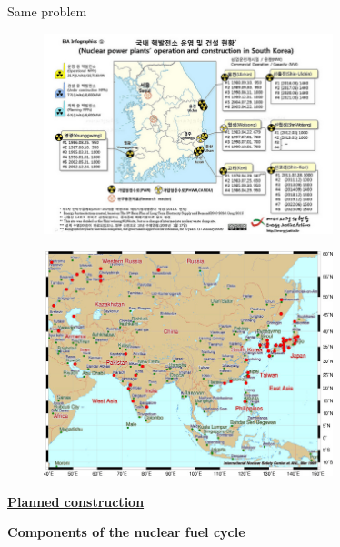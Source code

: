 \documentclass[aspectratio=1610,pdftex,dvipsnames,compress,xcolor={dvipsnames}]{beamer}
\begin{document}
\begin{frame}{Same problem}
    \begin{figure}
        \centering
        \includegraphics[width=0.75\textwidth]{korea.jpg}
    \end{figure}
\end{frame}


\begin{frame}{}
    \begin{figure}
        \centering
        \includegraphics[width=0.75\textwidth]{asia.jpg}
    \end{figure}
\end{frame}


\begin{frame}[plain]{}
    \centering\LARGE\textbf{\href{https://www.world-nuclear.org/information-library/current-and-future-generation/plans-for-new-reactors-worldwide.aspx}{Planned construction}}
\end{frame}


\begin{frame}[plain]{}
    \centering\LARGE\textbf{Components of the nuclear fuel cycle}
\end{frame}
\end{document}
